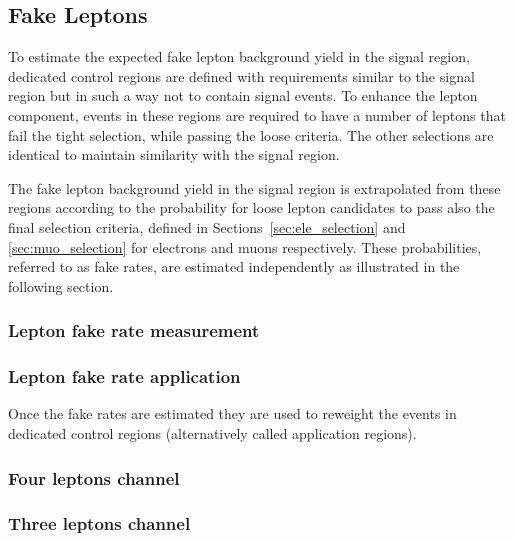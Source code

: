 \subsection{Fake Leptons}
\label{sec:fake_leptons}
To estimate the expected fake lepton background yield in the signal region,
dedicated control regions are defined with requirements similar to the signal region but in such a way not to contain signal events.
To enhance the \nonprompt lepton component, events in these regions are required to
have a number of leptons that fail the tight selection, while passing the loose criteria.
The other selections are identical to maintain similarity with the signal region.

The fake lepton background yield in the signal region is extrapolated from these regions
according to the probability for loose lepton candidates to pass also the final selection criteria,
defined in Sections~\ref{sec:ele_selection} and \ref{sec:muo_selection} for electrons and muons respectively.
These probabilities, referred to as fake rates, are estimated independently as illustrated in the following section.

\subsubsection{Lepton fake rate measurement}


\subsubsection{Lepton fake rate application}
Once the fake rates are estimated they are used to reweight the events
in dedicated control regions (alternatively called application regions).

\subsubsection{Four leptons channel}


\subsubsection{Three leptons channel}


